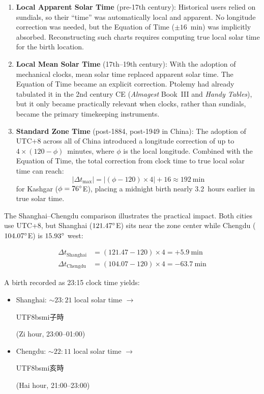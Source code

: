 \documentclass[10pt,a4paper]{article}
\newcommand{\zh}[1]{\begin{CJK}{UTF8}{bsmi}#1\end{CJK}}
\begin{document}
\begin{enumerate}
  \item \textbf{Local Apparent Solar Time} (pre-17th century):
    Historical users relied on sundials, so their ``time'' was
    automatically local and apparent. No longitude correction was
    needed, but the Equation of Time ($\pm 16$~min) was implicitly
    absorbed. Reconstructing such charts requires computing true local
    solar time for the birth location.

  \item \textbf{Local Mean Solar Time} (17th--19th century):
    With the adoption of mechanical clocks, mean solar time replaced
    apparent solar time. The Equation of Time became an explicit
    correction. Ptolemy had already tabulated it in the 2nd century CE
    (\textit{Almagest} Book~III and \textit{Handy Tables}), but it only
    became practically relevant when clocks, rather than sundials,
    became the primary timekeeping instruments.

  \item \textbf{Standard Zone Time} (post-1884, post-1949 in China):
    The adoption of UTC+8 across all of China introduced a longitude
    correction of up to $4 \times (120 - \phi)$~minutes, where $\phi$
    is the local longitude. Combined with the Equation of Time, the
    total correction from clock time to true local solar time can reach:
    \[
      |\Delta t_{\max}| = |(\phi - 120) \times 4| + 16 \approx 192~\text{min}
    \]
    for Kashgar ($\phi = 76\degree$E), placing a midnight birth nearly
    3.2~hours earlier in true solar time.
\end{enumerate}

\noindent
The Shanghai--Chengdu comparison illustrates the practical impact.
Both cities use UTC+8, but Shanghai ($121.47\degree$E) sits near the
zone center while Chengdu ($104.07\degree$E) is $15.93\degree$ west:

\begin{align}
  \Delta t_{\text{Shanghai}} &= (121.47 - 120) \times 4 = +5.9~\text{min} \\
  \Delta t_{\text{Chengdu}}  &= (104.07 - 120) \times 4 = -63.7~\text{min}
\end{align}

\noindent
A birth recorded as 23:15 clock time yields:
\begin{itemize}[nosep]
  \item Shanghai: ${\sim}23{:}21$ local solar time $\to$ \zh{子時}
    (Zi hour, 23:00--01:00)
  \item Chengdu: ${\sim}22{:}11$ local solar time $\to$ \zh{亥時}
    (Hai hour, 21:00--23:00)
\end{itemize}
\end{document}
